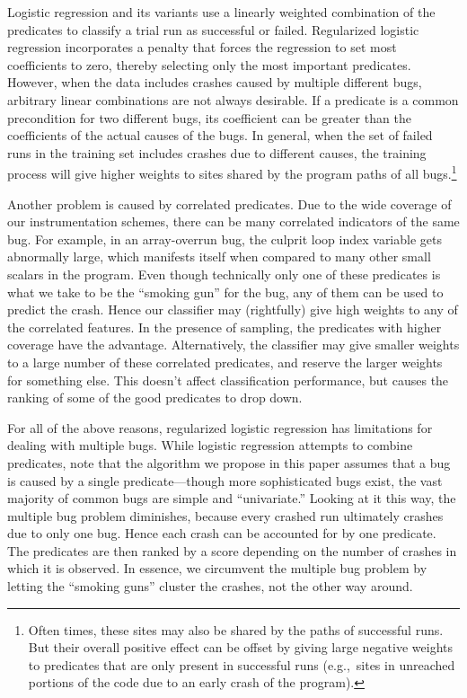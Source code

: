Logistic regression and its variants use a linearly weighted
combination of the predicates to classify a trial run as successful or
failed.  Regularized logistic regression incorporates a penalty
that forces the regression to set most coefficients to zero, thereby
selecting only the most important predicates.  However, when the data
includes crashes caused by multiple different bugs, arbitrary linear
combinations are not always desirable.  If a predicate is a
common precondition for two different bugs, its coefficient
can be greater than the coefficients of the actual causes of the bugs.
In general, when the set of failed runs in
the training set includes crashes due to different causes, the
training process will give higher weights to sites shared by the
program paths of all bugs.\footnote{Often times, these sites may also be
shared by the paths of successful runs.  But their overall positive
effect can be offset by giving large negative weights to predicates
that are only present in successful runs (e.g.,\ sites in unreached
portions of the code due to an early crash of the program).}

Another problem is caused by correlated predicates.
Due to the wide coverage of our instrumentation schemes, there can be
many correlated indicators of the same bug.  For example, in an
array-overrun bug, the culprit loop index variable gets abnormally
large, which manifests itself when compared to many other small
scalars in the program.  Even though technically only one of these
predicates is what we take to be the ``smoking gun'' for the bug, any
of them can be used to predict the crash.  Hence our classifier may
(rightfully) give high weights to any of the correlated features.  In
the presence of sampling, the predicates with higher coverage have the
advantage.  Alternatively, the classifier may give smaller
weights to a large number of these correlated predicates, and reserve
the larger weights for something else.  This doesn't affect
classification performance, but causes the ranking of
some of the good predicates to drop down.

For all of the above reasons, regularized logistic regression has
limitations for dealing with multiple bugs.  While logistic
regression attempts to combine predicates, note that the algorithm we
propose in this paper assumes that a bug is caused by a single
predicate---though more sophisticated bugs exist, the vast majority of
common bugs are simple and ``univariate.''  Looking at it this way,
the multiple bug problem diminishes, because every crashed run
ultimately crashes due to only one bug.  Hence each crash can be
accounted for by one predicate.  The predicates are then ranked by a
score depending on the number of crashes in which it is observed.  In
essence, we circumvent the multiple bug problem by letting the
``smoking guns'' cluster the crashes, not the other way around.


